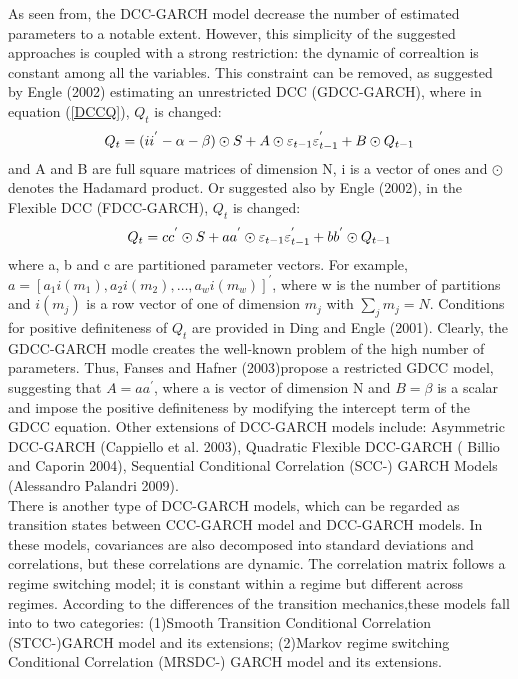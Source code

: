 \documentclass[a4paper,12pt]{article}
\begin{document}
\noindent As seen from, the DCC-GARCH model decrease the number of estimated parameters to a notable extent. However, this simplicity of the suggested approaches is coupled with a strong restriction: the dynamic of correaltion is constant among all the variables. This constraint can be removed, as suggested by Engle (2002) estimating an unrestricted DCC (GDCC-GARCH), where in equation (\ref{DCCQ}), $Q_t$ is changed:
\begin{equation}
\centering
Q_t = ( i\/i^{'} - \alpha- \beta)\odot S + A \odot\varepsilon_{t-1}\varepsilon_{t-1}^{'} + B\odot Q_{t-1}
\end{equation}
and A and B are full square matrices of dimension N, i is a vector of ones and $\odot$ denotes the Hadamard product.
Or suggested also by Engle (2002), in the Flexible DCC (FDCC-GARCH), $Q_t$ is changed:
\begin{equation}
\centering
Q_t = c\/c^{'}\odot S + a\/a^{'} \odot\varepsilon_{t-1}\varepsilon_{t-1}^{'} + b\/b^{'}\odot Q_{t-1}
\end{equation}
where a, b and c are partitioned parameter vectors. For example, $a = [a_1i(m_1), a_2i(m_2),\ldots, a_wi(m_w)]^{'}$, where w is the number of partitions and $i(m_j)$ is a row vector of one of dimension $m_j$ with $\sum_{j}m_j = N$.
Conditions for positive definiteness of $Q_t$ are provided in Ding and Engle (2001). Clearly, the GDCC-GARCH modle creates the well-known problem of the high number of parameters. Thus, Fanses and Hafner (2003)propose a restricted GDCC model, suggesting that $A = aa^{'}$, where a is vector of dimension N and $B = \beta$ is a scalar and impose the positive definiteness by modifying the intercept term of the GDCC equation. Other extensions of DCC-GARCH models include: Asymmetric DCC-GARCH (Cappiello et al. 2003), Quadratic Flexible DCC-GARCH ( Billio and Caporin 2004), Sequential Conditional Correlation (SCC-) GARCH Models (Alessandro Palandri 2009).\\

\noindent There is another type of DCC-GARCH models, which can be regarded as transition states between CCC-GARCH model and DCC-GARCH models. In these models, covariances are also decomposed into standard deviations and correlations, but these correlations are dynamic. The correlation matrix follows a regime switching model; it is constant within a regime but different across regimes. According to the differences of the transition mechanics,these models fall into to two categories: (1)Smooth Transition Conditional Correlation (STCC-)GARCH model and its extensions; (2)Markov regime switching Conditional Correlation (MRSDC-) GARCH model and its extensions.\\
\end{document}

